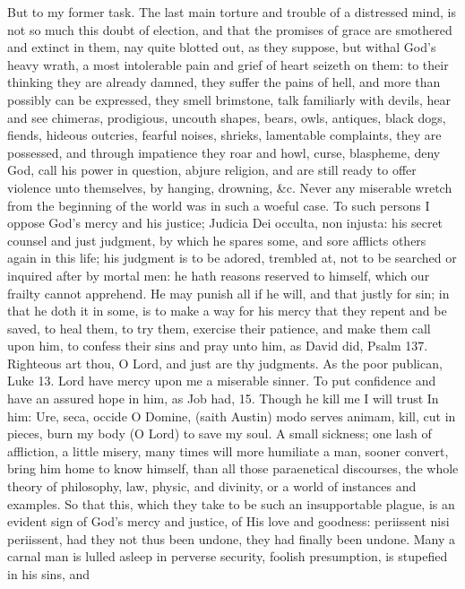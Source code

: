 {But to my former task. The last main torture and trouble of a
distressed mind, is not so much this doubt of election, and that the
promises of grace are smothered and extinct in them, nay quite blotted
out, as they suppose, but withal God's heavy wrath, a most intolerable
pain and grief of heart seizeth on them: to their thinking they are
already damned, they suffer the pains of hell, and more than possibly
can be expressed, they smell brimstone, talk familiarly with devils,
hear and see chimeras, prodigious, uncouth shapes, bears, owls,
antiques, black dogs, fiends, hideous outcries, fearful noises,
shrieks, lamentable complaints, they are possessed, and through
impatience they roar and howl, curse, blaspheme, deny God, call his
power in question, abjure religion, and are still ready to offer
violence unto themselves, by hanging, drowning, \&c. Never any miserable
wretch from the beginning of the world was in such a woeful case. To
such persons I oppose God's mercy and his justice; Judicia Dei occulta,
non injusta: his secret counsel and just judgment, by which he spares
some, and sore afflicts others again in this life; his judgment is to
be adored, trembled at, not to be searched or inquired after by mortal
men: he hath reasons reserved to himself, which our frailty cannot
apprehend. He may punish all if he will, and that justly for sin; in
that he doth it in some, is to make a way for his mercy that they
repent and be saved, to heal them, to try them, exercise their
patience, and make them call upon him, to confess their sins and pray
unto him, as David did, Psalm  137. Righteous art thou, O Lord,
and just are thy judgments. As the poor publican, Luke  13. Lord
have mercy upon me a miserable sinner. To put confidence and have an
assured hope in him, as Job had,  15. Though he kill me I will
trust In him: Ure, seca, occide O Domine, (saith Austin) modo serves
animam, kill, cut in pieces, burn my body (O Lord) to save my soul. A
small sickness; one lash of affliction, a little misery, many times
will more humiliate a man, sooner convert, bring him home to know
himself, than all those paraenetical discourses, the whole theory of
philosophy, law, physic, and divinity, or a world of instances and
examples. So that this, which they take to be such an insupportable
plague, is an evident sign of God's mercy and justice, of His love and
goodness: periissent nisi periissent, had they not thus been undone,
they had finally been undone. Many a carnal man is lulled asleep in
perverse security, foolish presumption, is stupefied in his sins, and
}
